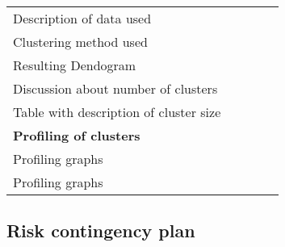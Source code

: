 \begin{table}[H]
\begin{tabular}{@{}l|c|c|c|c@{}}
Description of data used                        &    &    &    &    \\
Clustering method used                          &    &    &    &    \\
Resulting Dendogram                             &    &    &    &    \\
Discussion about number of clusters             &    &    &    &    \\
Table with description of cluster size          &    &    &    &    \\ \midrule
\textbf{Profiling of clusters}                  &    &    &    &    \\
Profiling graphs                                &    &    &    &    \\
Profiling graphs                                &    &    &    &    \\ \bottomrule
\end{tabular}
\end{table}

\subsection{Risk contingency plan}%
\label{sub:risk_contingency_plan}



